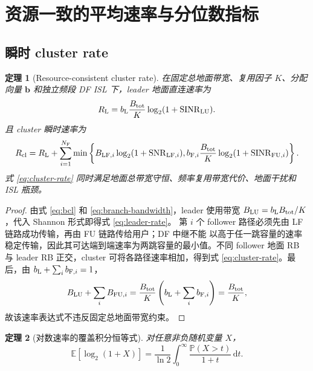 \documentclass[UTF8,a4paper,11pt]{ctexart}
\newtheorem{theorem}{定理}[section]
\newcommand{\E}{\mathbb E}
\newcommand{\Prob}{\mathbb P}
\newcommand{\dd}{\,\mathrm d}
\newcommand{\NF}{N_{\mathrm F}}
\newcommand{\SINR}{\operatorname{SINR}}
\newcommand{\SNR}{\operatorname{SNR}}
\newcommand{\Btot}{B_{\mathrm{tot}}}
\newcommand{\bvec}{\bm b}
\begin{document}
\section{资源一致的平均速率与分位数指标}

\subsection{瞬时 cluster rate}

\begin{theorem}[Resource-consistent cluster rate]
\label{thm:cluster-rate}
在固定总地面带宽、复用因子 $K$、分配向量 $\bvec$ 和独立频段 DF ISL 下，leader
地面直连速率为
\begin{equation}
 R_{\rm L}
 =
 b_{\rm L}\frac{\Btot}{K}
 \log_2(1+\SINR_{\rm LU}).
 \label{eq:leader-rate}
\end{equation}
且 cluster 瞬时速率为
\begin{equation}
 R_{\rm cl}
 =
 R_{\rm L}
 +\sum_{i=1}^{\NF}
 \min\left\{
 B_{{\rm LF},i}\log_2(1+\SNR_{{\rm LF},i}),
 b_{{\rm F},i}\frac{\Btot}{K}
 \log_2(1+\SINR_{{\rm FU},i})
 \right\}.
 \label{eq:cluster-rate}
\end{equation}
式 \eqref{eq:cluster-rate} 同时满足地面总带宽守恒、频率复用带宽代价、地面干扰和 ISL
瓶颈。
\end{theorem}

\begin{proof}
由式 \eqref{eq:bcl} 和 \eqref{eq:branch-bandwidth}，leader 使用带宽
$B_{\rm LU}=b_{\rm L}\Btot/K$，代入 Shannon 形式即得式 \eqref{eq:leader-rate}。
第 $i$ 个 follower 路径必须先由 LF 链路成功传输，再由 FU 链路传给用户；DF 中继不能
以高于任一跳容量的速率稳定传输，因此其可达端到端速率为两跳容量的最小值。不同
follower 地面 RB 与 leader RB 正交，cluster 可将各路径速率相加，得到式
\eqref{eq:cluster-rate}。最后，由
$b_{\rm L}+\sum_i b_{{\rm F},i}=1$，
\begin{equation}
 B_{\rm LU}+\sum_iB_{{\rm FU},i}
 =
 \frac{\Btot}{K}
 \left(b_{\rm L}+\sum_ib_{{\rm F},i}\right)
 =\frac{\Btot}{K},
\end{equation}
故该速率表达式不违反固定总地面带宽约束。
\end{proof}

\begin{theorem}[对数速率的覆盖积分恒等式]
对任意非负随机变量 $X$，
\begin{equation}
 \E[\log_2(1+X)]
 =
 \frac{1}{\ln2}\int_0^\infty
 \frac{\Prob(X>t)}{1+t}\dd t.
 \label{eq:tail-rate}
\end{equation}
\end{theorem}
\end{document}
